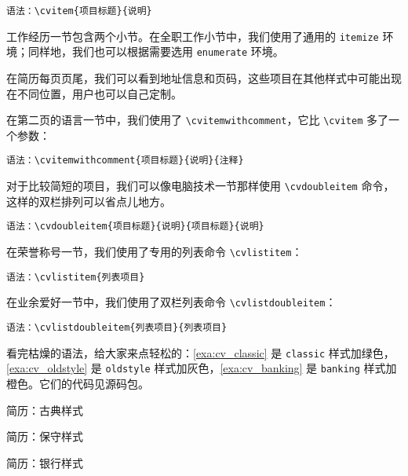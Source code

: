 \verb|语法：\cvitem{项目标题}{说明}|

工作经历一节包含两个小节。在全职工作小节中，我们使用了通用的 \texttt{itemize} 环境；同样地，我们也可以根据需要选用 \texttt{enumerate} 环境。

在简历每页页尾，我们可以看到地址信息和页码，这些项目在其他样式中可能出现在不同位置，用户也可以自己定制。

在第二页的语言一节中，我们使用了 \verb|\cvitemwithcomment|，它比 \verb|\cvitem| 多了一个参数：

\verb|语法：\cvitemwithcomment{项目标题}{说明}{注释}|

对于比较简短的项目，我们可以像电脑技术一节那样使用 \verb|\cvdoubleitem| 命令，这样的双栏排列可以省点儿地方。

\verb|语法：\cvdoubleitem{项目标题}{说明}{项目标题}{说明}|

在荣誉称号一节，我们使用了专用的列表命令 \verb|\cvlistitem|：

\verb|语法：\cvlistitem{列表项目}|

在业余爱好一节中，我们使用了双栏列表命令 \verb|\cvlistdoubleitem|：

\verb|语法：\cvlistdoubleitem{列表项目}{列表项目}|

看完枯燥的语法，给大家来点轻松的：\autoref{exa:cv_classic} 是 \texttt{classic} 样式加绿色，\autoref{exa:cv_oldstyle} 是 \texttt{oldstyle} 样式加灰色，\autoref{exa:cv_banking} 是 \texttt{banking} 样式加橙色。它们的代码见源码包。

\begin{example}[h]
\begin{Demo}
\centering
{}
\end{Demo}
\caption{简历：古典样式}
\label{exa:cv_classic}
\end{example}

\begin{example}[h]
\begin{Demo}
\centering
{}
\end{Demo}
\caption{简历：保守样式}
\label{exa:cv_oldstyle}
\end{example}

\begin{example}[!h]
\begin{Demo}
\centering
{}
\end{Demo}
\caption{简历：银行样式}
\label{exa:cv_banking}
\end{example}

